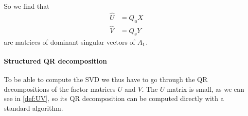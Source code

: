 So we find that
\begin{equation*}
  \begin{split}
    \hat{U} &= Q_u X\\
    \hat{V} &= Q_v Y
  \end{split}
\end{equation*}
are matrices of dominant singular vectors of $A_1$.

\paragraph{Structured QR decomposition}
To be able to compute the SVD we thus have to go through the QR decompositions of the factor matrices $U$ and $V$.
The $U$ matrix is small, as we can see in \eqref{def:UV}, so its QR decomposition can be computed directly with a standard algorithm.

